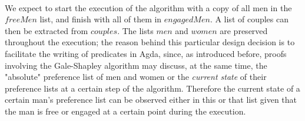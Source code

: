 {\begin{code}
\>[4]\AgdaSpace{}%
\AgdaSymbol{:}\AgdaSpace{}%
\AgdaSpace{}%
\AgdaSymbol{(}\AgdaSpace{}%
\AgdaSpace{}%
\AgdaSpace{}%
\AgdaSymbol{)}\<%
\\
%
\>[4]\AgdaSpace{}%
\AgdaSymbol{:}\AgdaSpace{}%
\AgdaSpace{}%
\AgdaSymbol{(}\AgdaSpace{}%
\AgdaSpace{}%
\AgdaSpace{}%
\AgdaSymbol{)}\<%
\\
%
\>[4]\AgdaSpace{}%
\AgdaSymbol{:}\AgdaSpace{}%
\AgdaSpace{}%
\AgdaSymbol{(}\AgdaSpace{}%
\AgdaSpace{}%
\AgdaSpace{}%
\AgdaSymbol{)}\<%
\\
%
\>[4]\AgdaSpace{}%
\AgdaSymbol{:}\AgdaSpace{}%
\AgdaSpace{}%
\AgdaSymbol{(}\AgdaSpace{}%
\AgdaSpace{}%
\AgdaSpace{}%
\AgdaSymbol{)}\<%
\\
%
\>[4]\AgdaSpace{}%
\AgdaSymbol{:}\AgdaSpace{}%
\AgdaSpace{}%
\AgdaSymbol{(}\AgdaSpace{}%
\AgdaSpace{}%
\AgdaSymbol{)}\<%
\\
%
\>[4]\AgdaSpace{}%
\AgdaSymbol{:}\AgdaSpace{}%
\<%
\\
%
\>[4]\AgdaSpace{}%
\AgdaSymbol{:}\AgdaSpace{}%
\AgdaSpace{}%
\AgdaSpace{}%
\AgdaSpace{}%
\AgdaSpace{}%
\AgdaOperator{\AgdaPrimitive{+}}\AgdaSpace{}%
\AgdaSpace{}%
\<%
\end{code}

We expect to start the execution of the algorithm with a copy of all men in the $freeMen$ list, and finish with all of them in $engagedMen$. A list of couples can then be extracted from $couples$. The lists $men$ and $women$ are preserved throughout the execution; the reason behind this particular design decision is to facilitate the writing of predicates in Agda, since, as introduced before, proofs involving the Gale-Shapley algorithm may discuss, at the same time, the "absolute" preference list of men and women or the \emph{current state} of their preference lists at a certain step of the algorithm. Therefore the current state of a certain man's preference list can be observed either in this or that list given that the man is free or engaged at a certain point during the execution.

}
